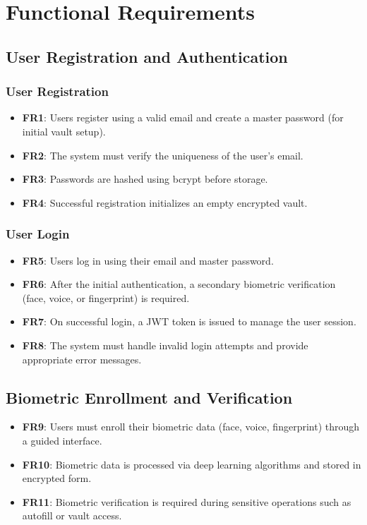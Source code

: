 \documentclass{scrreprt}
\begin{document}
\chapter{Functional Requirements}
\section{User Registration and Authentication}
\subsection{User Registration}
\begin{itemize}
    \item \textbf{FR1}: Users register using a valid email and create a master password (for initial vault setup).
    \item \textbf{FR2}: The system must verify the uniqueness of the user’s email.
    \item \textbf{FR3}: Passwords are hashed using bcrypt before storage.
    \item \textbf{FR4}: Successful registration initializes an empty encrypted vault.
\end{itemize}

\subsection{User Login}
\begin{itemize}
    \item \textbf{FR5}: Users log in using their email and master password.
    \item \textbf{FR6}: After the initial authentication, a secondary biometric verification (face, voice, or fingerprint) is required.
    \item \textbf{FR7}: On successful login, a JWT token is issued to manage the user session.
    \item \textbf{FR8}: The system must handle invalid login attempts and provide appropriate error messages.
\end{itemize}

\section{Biometric Enrollment and Verification}
\begin{itemize}
    \item \textbf{FR9}: Users must enroll their biometric data (face, voice, fingerprint) through a guided interface.
    \item \textbf{FR10}: Biometric data is processed via deep learning algorithms and stored in encrypted form.
    \item \textbf{FR11}: Biometric verification is required during sensitive operations such as autofill or vault access.
\end{itemize}
\end{document}
